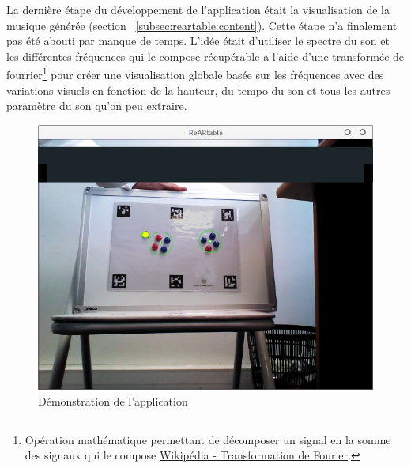 La dernière étape du développement de l'application était la visualisation de la musique générée (section ~\ref{subsec:reartable:content}). Cette étape n'a finalement pas été abouti par manque de temps. L'idée était d'utiliser le spectre du son et les différentes fréquences qui le compose récupérable a l'aide d'une transformée de fourrier\footnote{Opération mathématique permettant de décomposer un signal en la somme des signaux qui le compose \href{https://fr.wikipedia.org/wiki/Transformation_de_Fourier}{Wikipédia - Transformation de Fourier}.} pour créer une visualisation globale basée sur les fréquences avec des variations visuels en fonction de la hauteur, du tempo du son et tous les autres paramètre du son qu'on peu extraire.

\begin{figure}[H]
\centering
\includegraphics[width=0.65\linewidth]{images/reactable}
\caption{Démonstration de l'application}
\label{fig:reartable:demo}
\end{figure}




